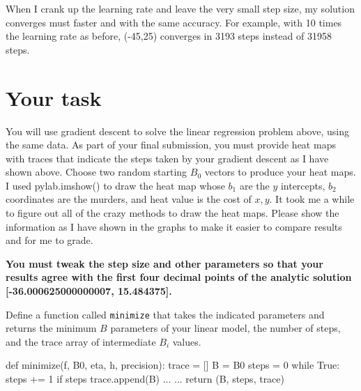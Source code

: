 \begin{fullwidth}
\noindent {}

When I crank up the learning rate and leave the very small step size, my solution converges must faster and with the same accuracy. For example, with 10 times the learning rate as before, (-45,25) converges in 3193 steps instead of 31958 steps.

\section{Your task}

You will use gradient descent to solve the linear regression problem above, using the same data. As part of your final submission, you must provide heat maps with traces that indicate the steps taken by your gradient descent as I have shown above. Choose two random starting $B_0$ vectors to produce your heat maps. I used pylab.imshow() to draw the heat map whose $b_1$ are the $y$ intercepts, $b_2$ coordinates are the murders, and heat value is the cost of $x,y$.  It took me a while to figure out all of the crazy methods to draw the heat maps. Please show the information as I have shown in the graphs to make it easier to compare results and for me to grade.

{\bf You must tweak the step size and other parameters so that your results agree with the first four decimal points of the analytic solution [-36.000625000000007, 15.484375].}

Define a function called {\tt minimize} that takes the indicated parameters and returns the minimum $B$ parameters of your linear model, the number of steps, and the trace array of intermediate $B_i$ values.

\begin{pyverbatim}
def minimize(f, B0, eta, h, precision):
    trace = []
    B = B0
    steps = 0 
    while True:
        steps += 1
        if steps %
            trace.append(B)
        ...     
    ... 
    return (B, steps, trace)
\end{pyverbatim}


\end{fullwidth}
